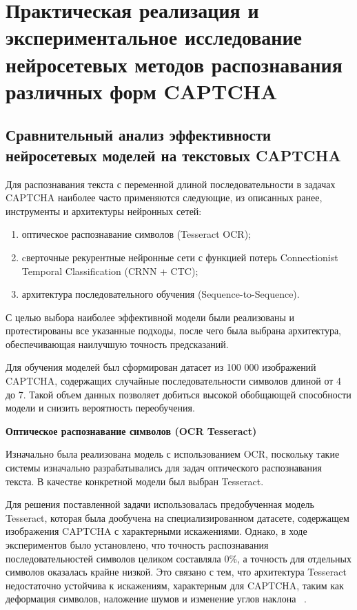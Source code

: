 \chapter{Практическая реализация и экспериментальное исследование нейросетевых методов распознавания различных форм CAPTCHA}

\section{Сравнительный анализ эффективности нейросетевых моделей на текстовых CAPTCHA}

Для распознавания текста с переменной длиной последовательности в задачах CAPTCHA 
наиболее часто применяются следующие, из описанных ранее, инструменты и 
архитектуры нейронных сетей:

\begin{enumerate}
    \item оптическое распознавание символов (Tesseract OCR);
    \item cверточные рекурентные нейронные сети с функцией потерь Connectionist 
    Temporal Classification (CRNN + CTC);
    \item архитектура последовательного обучения (Sequence-to-Sequence).
\end{enumerate}

С целью выбора наиболее эффективной модели были реализованы и протестированы все 
указанные подходы, после чего была выбрана архитектура, обеспечивающая наилучшую 
точность предсказаний.

Для обучения моделей был сформирован датасет из 100 000 изображений CAPTCHA, 
содержащих случайные последовательности символов длиной от 4 до 7. Такой объем 
данных позволяет добиться высокой обобщающей способности модели и снизить 
вероятность переобучения.

\textbf{Оптическое распознавание символов (OCR Tesseract)}

Изначально была реализована модель с использованием OCR, поскольку такие системы 
изначально разрабатывались для задач оптического распознавания текста. В качестве 
конкретной модели был выбран Tesseract.

Для решения поставленной задачи использовалась предобученная модель Tesseract, 
которая была дообучена на специализированном датасете, содержащем изображения 
CAPTCHA с характерными искажениями. Однако, в ходе экспериментов было установлено, 
что точность распознавания последовательностей символов целиком составляла 0\%, а 
точность для отдельных символов оказалась крайне низкой. Это связано с тем, что 
архитектура Tesseract недостаточно устойчива к искажениям, характерным для 
CAPTCHA, таким как деформация символов, наложение шумов и изменение углов наклона
~\cite{TrainTesseract}.

